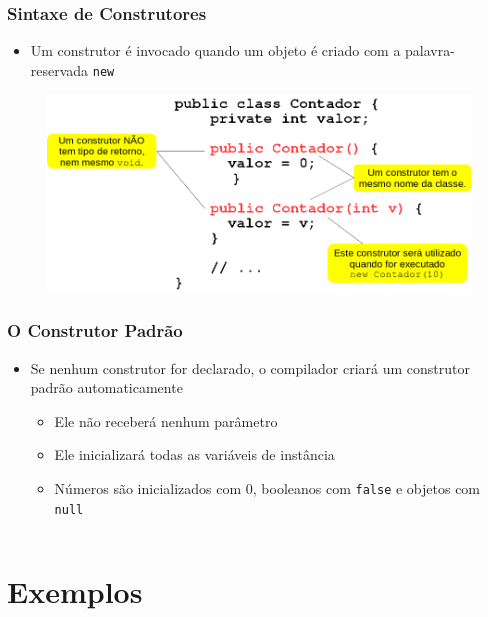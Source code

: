 \documentclass[xcolor={dvipsnames,table},aspectratio=169]{beamer}
\begin{document}
\begin{frame}\frametitle{Sintaxe de Construtores}
\begin{itemize}
	\item Um construtor é invocado quando um objeto é criado com a palavra-reservada \texttt{new}
\end{itemize}
\begin{figure}[h]
	\includegraphics[height=0.60\paperheight,center]{pucrs-ep-fprog-unidade_07-objetos_e_classes-laminas-sintaxe_construtores.png}
\end{figure}
\end{frame}

\begin{frame}[fragile]\frametitle{O Construtor Padrão}
\begin{itemize}
	\item Se nenhum construtor for declarado, o compilador criará um construtor padrão automaticamente
	\begin{itemize}
		\item Ele não receberá nenhum parâmetro
		\item Ele inicializará todas as variáveis de instância
		\item Números são inicializados com 0, booleanos com \texttt{false} e objetos com \texttt{null}
	\end{itemize}
\end{itemize}
{\scriptsize\inputminted[bgcolor=cyan!10]{java}{src/contagem1/Contador.java}}
\end{frame}

\section{Exemplos}
\end{document}

